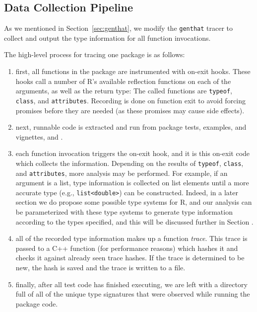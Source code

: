 \documentclass[acmsmall,10pt,review,anonymous]{acmart}\settopmatter{printfolios=true,printccs=false,printacmref=false}
\begin{document}
%
%
%
%
\subsection{Data Collection Pipeline}

As we mentioned in Section~\ref{sec:genthat}, we modify the {\tt genthat} tracer to collect and output the type information for all function invocations.

The high-level process for tracing one package is as follows:

\begin{enumerate}
	\item first, all functions in the package are instrumented with on-exit hooks.
  	These hooks call a number of R's available reflection functions on each of the arguments, as well as the return type: 
  	The called functions are {\tt typeof}, {\tt class}, and {\tt attributes}.  
  	Recording is done on function exit to avoid forcing promises before they are needed (as these promises may cause side effects).
  
  	\item next, runnable code is extracted and run from package tests, examples, and vignettes, and .
  
	\item each function invocation triggers the on-exit hook, and it is this on-exit code which collects the information.
	Depending on the results of {\tt typeof}, {\tt class}, and {\tt attributes}, more analysis may be performed.
	For example, if an argument is a list, type information is collected on list elements until a more accurate type (e.g., {\tt list<double>}) can be constructed.
	Indeed, in a later section we do propose some possible type systems for R, and our analysis can be parameterized with these type systems to generate type information according to the types specified, and this will be discussed further in Section .
	
	\item all of the recorded type information makes up a function {\it trace}.
	This trace is passed to a C++ function (for performance reasons) which hashes it and checks it against already seen trace hashes.
	If the trace is determined to be new, the hash is saved and the trace is written to a file.
	
	\item finally, after all test code has finished executing, we are left with a directory full of all of the unique type signatures that were observed while running the package code.
	
\end{enumerate}
\end{document}
